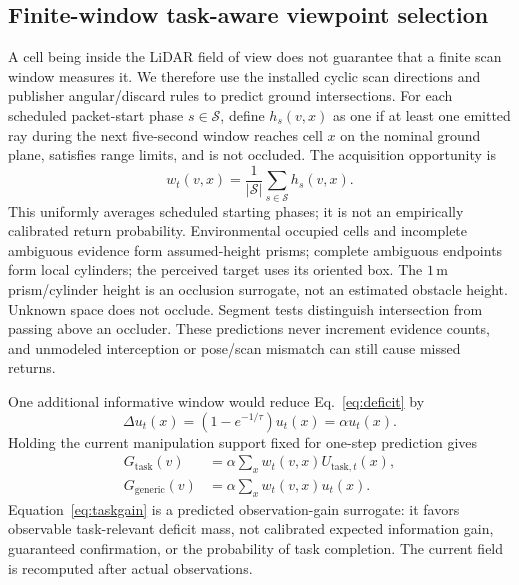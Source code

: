\subsection{Finite-window task-aware viewpoint selection}
\label{sec:nbv}
A cell being inside the LiDAR field of view does not guarantee that a finite
scan window measures it. We therefore use the installed cyclic scan directions
and publisher angular/discard rules to predict ground intersections. For each
scheduled packet-start phase $s\in\mathcal S$, define $h_s(v,x)$ as one if at
least one emitted ray during the next five-second window reaches cell $x$ on
the nominal ground plane, satisfies range limits, and is not occluded. The
acquisition opportunity is
\begin{equation}
 w_t(v,x)=\frac{1}{|\mathcal S|}\sum_{s\in\mathcal S}h_s(v,x).
 \label{eq:opportunity}
\end{equation}
This uniformly averages scheduled starting phases; it is not an empirically
calibrated return probability. Environmental occupied cells and incomplete
ambiguous evidence form assumed-height prisms; complete ambiguous endpoints
form local cylinders; the perceived target uses its oriented box. The
$1\,\mathrm{m}$ prism/cylinder height is an occlusion surrogate, not an estimated
obstacle height. Unknown space does not occlude. Segment tests distinguish
intersection from passing above an occluder. These predictions never increment
evidence counts, and unmodeled interception or pose/scan mismatch can still cause
missed returns.

One additional informative window would reduce Eq.~\eqref{eq:deficit} by
\begin{equation}
 \Delta u_t(x)=(1-e^{-1/\tau})u_t(x)=\alpha u_t(x).
 \label{eq:delta}
\end{equation}
Holding the current manipulation support fixed for one-step prediction gives
\begin{align}
 G_{\mathrm{task}}(v)&=\alpha\sum_xw_t(v,x)U_{\mathrm{task},t}(x),\label{eq:taskgain}\\
 G_{\mathrm{generic}}(v)&=\alpha\sum_xw_t(v,x)u_t(x).
 \label{eq:genericgain}
\end{align}
Equation~\eqref{eq:taskgain} is a predicted observation-gain surrogate: it favors
observable task-relevant deficit mass, not calibrated expected information
gain, guaranteed confirmation, or the probability of task completion.
The current field is recomputed after actual observations.

